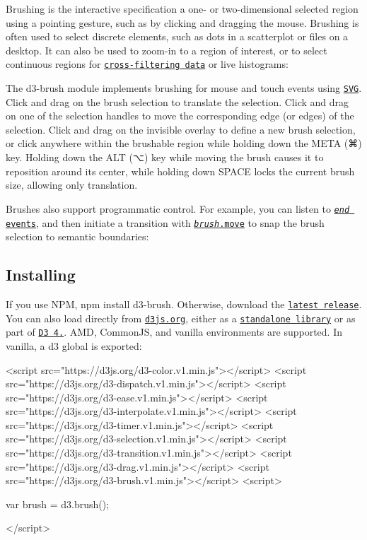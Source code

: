 Brushing is the interactive specification a one-\/ or two-\/dimensional selected region using a pointing gesture, such as by clicking and dragging the mouse. Brushing is often used to select discrete elements, such as dots in a scatterplot or files on a desktop. It can also be used to zoom-\/in to a region of interest, or to select continuous regions for \href{http://square.github.io/crossfilter/}{\tt cross-\/filtering data} or live histograms\+:

\href{http://bl.ocks.org/mbostock/0d20834e3d5a46138752f86b9b79727e}{\tt }

The d3-\/brush module implements brushing for mouse and touch events using \href{https://www.w3.org/TR/SVG/}{\tt S\+VG}. Click and drag on the brush selection to translate the selection. Click and drag on one of the selection handles to move the corresponding edge (or edges) of the selection. Click and drag on the invisible overlay to define a new brush selection, or click anywhere within the brushable region while holding down the M\+E\+TA (⌘) key. Holding down the A\+LT (⌥) key while moving the brush causes it to reposition around its center, while holding down S\+P\+A\+CE locks the current brush size, allowing only translation.

Brushes also support programmatic control. For example, you can listen to \href{#brush-events}{\tt {\itshape end} events}, and then initiate a transition with \href{#brush_move}{\tt {\itshape brush}.move} to snap the brush selection to semantic boundaries\+:

\href{http://bl.ocks.org/mbostock/6232537}{\tt }

\subsection*{Installing}

If you use N\+PM, {\ttfamily npm install d3-\/brush}. Otherwise, download the \href{https://github.com/d3/d3-brush/releases/latest}{\tt latest release}. You can also load directly from \href{https://d3js.org}{\tt d3js.\+org}, either as a \href{https://d3js.org/d3-brush.v1.min.js}{\tt standalone library} or as part of \href{https://github.com/d3/d3}{\tt D3 4.}. A\+MD, Common\+JS, and vanilla environments are supported. In vanilla, a {\ttfamily d3} global is exported\+:


\begin{DoxyCode}
<script src="https://d3js.org/d3-color.v1.min.js"></script>
<script src="https://d3js.org/d3-dispatch.v1.min.js"></script>
<script src="https://d3js.org/d3-ease.v1.min.js"></script>
<script src="https://d3js.org/d3-interpolate.v1.min.js"></script>
<script src="https://d3js.org/d3-timer.v1.min.js"></script>
<script src="https://d3js.org/d3-selection.v1.min.js"></script>
<script src="https://d3js.org/d3-transition.v1.min.js"></script>
<script src="https://d3js.org/d3-drag.v1.min.js"></script>
<script src="https://d3js.org/d3-brush.v1.min.js"></script>
<script>

var brush = d3.brush();

</script>
\end{DoxyCode}


